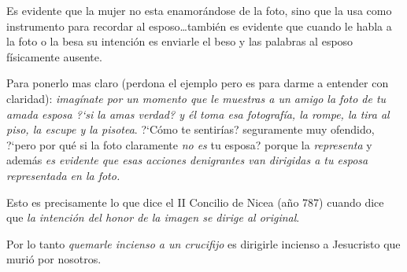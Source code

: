 \documentclass{article}
\begin{document}
Es evidente que la mujer no esta enamor\'andose de la foto, sino que la usa como instrumento para recordar al esposo\ldots tambi\'en es evidente que cuando le habla a la foto o la besa su intenci\'on es enviarle el beso y las palabras al esposo f\'{i}sicamente ausente.

Para ponerlo mas claro (perdona el ejemplo pero es para darme a entender con claridad): \emph{imag\'{i}nate por un momento que le muestras a un amigo la foto de tu amada esposa ?`si la amas verdad? y \'el toma esa fotograf\'{i}a, la rompe, la tira al piso, la escupe y la pisotea}. ?`C\'omo te sentir\'{i}as? seguramente muy ofendido, ?`pero por qu\'e si la foto claramente \emph{no es} tu esposa? porque la \emph{representa} y adem\'as \emph{es evidente que esas acciones denigrantes van dirigidas a tu esposa representada en la foto.}

Esto es precisamente lo que dice el II Concilio de Nicea (a\~no 787) cuando dice que \emph{la intenci\'on del honor de la imagen se dirige al original}.

Por lo tanto \emph{quemarle incienso a un crucifijo} es dirigirle incienso a Jesucristo que muri\'o por nosotros.





\end{document}

